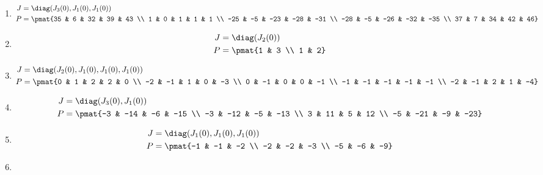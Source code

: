 \begin{enumerate}
\item

\begin{align*}
J &= \diag(J_{3}(0), J_{1}(0), J_{1}(0))\\
P &= \pmat{35 & 6 & 32 & 39 & 43 \\ 1 & 0 & 1 & 1 & 1 \\ -25 & -5 & -23 & -28 & -31 \\ -28 & -5 & -26 & -32 & -35 \\ 37 & 7 & 34 & 42 & 46}
\end{align*}

\item

\begin{align*}
J &= \diag(J_{2}(0))\\
P &= \pmat{1 & 3 \\ 1 & 2}
\end{align*}

\item

\begin{align*}
J &= \diag(J_{2}(0), J_{1}(0), J_{1}(0), J_{1}(0))\\
P &= \pmat{0 & 1 & 2 & 2 & 0 \\ -2 & -1 & 1 & 0 & -3 \\ 0 & -1 & 0 & 0 & -1 \\ -1 & -1 & -1 & -1 & -1 \\ -2 & -1 & 2 & 1 & -4}
\end{align*}

\item

\begin{align*}
J &= \diag(J_{3}(0), J_{1}(0))\\
P &= \pmat{-3 & -14 & -6 & -15 \\ -3 & -12 & -5 & -13 \\ 3 & 11 & 5 & 12 \\ -5 & -21 & -9 & -23}
\end{align*}

\item

\begin{align*}
J &= \diag(J_{1}(0), J_{1}(0), J_{1}(0))\\
P &= \pmat{-1 & -1 & -2 \\ -2 & -2 & -3 \\ -5 & -6 & -9}
\end{align*}

\item


\end{enumerate}
